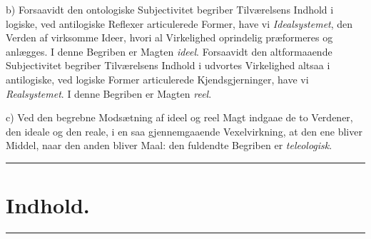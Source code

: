 \documentclass[11pt]{book}
\begin{document}
b) Forsaavidt den ontologiske Subjectivitet begriber Tilværelsens Indhold
i logiske, ved antilogiske Reflexer articulerede Former, have vi
\emph{Idealsystemet}, den Verden af virksomme Ideer, hvori al Virkelighed
oprindelig præformeres og anlægges. I denne Begriben er Magten
\emph{ideel}. Forsaavidt den altformaaende Subjectivitet begriber
Tilværelsens Indhold i udvortes Virkelighed altsaa i antilogiske, ved
logiske Former articulerede Kjendsgjerninger, have vi
\emph{Realsystemet}. I denne Begriben er Magten \emph{reel}.

c) Ved den begrebne Modsætning af ideel og reel Magt indgaae de to
Verdener, den ideale og den reale, i en saa gjennemgaaende
Vexelvirkning, at den ene bliver Middel, naar den anden bliver Maal: den
fuldendte Begriben er \emph{teleologisk}.

\begin{center}\rule{0.10\textwidth}{0.4pt}\end{center}

\clearpage
\section*{Indhold.}
\begin{center}\rule{0.10\textwidth}{0.4pt}\end{center}
\end{document}
